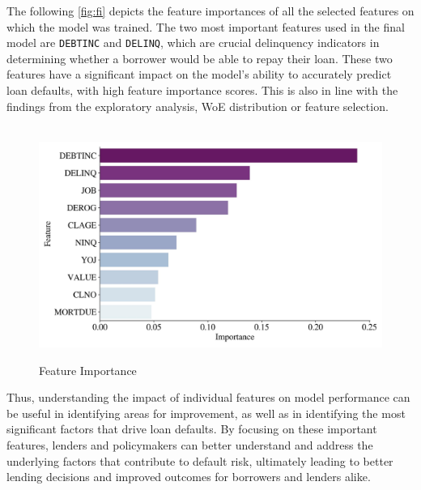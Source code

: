 The following \autoref{fig:fi} depicts the feature importances of all the selected features on which the model was trained.
The two most important features used in the final model are \texttt{DEBTINC} and \texttt{DELINQ}, which are crucial delinquency indicators in determining whether a borrower would be able to repay their loan. These two features have a significant impact on the model's ability to accurately predict loan defaults, with high feature importance scores. This is also in line with the findings from the exploratory analysis, WoE distribution or feature selection.
\begin{figure}[H]
\centering
\caption{Feature Importance}\vspace{0.5em}
\label{fig:fi}\
\includegraphics[width=140mm]{Figures/Feature_Importances.jpg}

\vspace{-1em}
\end{figure}

Thus, understanding the impact of individual features on model performance can be useful in identifying areas for improvement, as well as in identifying the most significant factors that drive loan defaults.
By focusing on these important features, lenders and policymakers can better understand and address the underlying factors that contribute to default risk, ultimately leading to better lending decisions and improved outcomes for borrowers and lenders alike.


